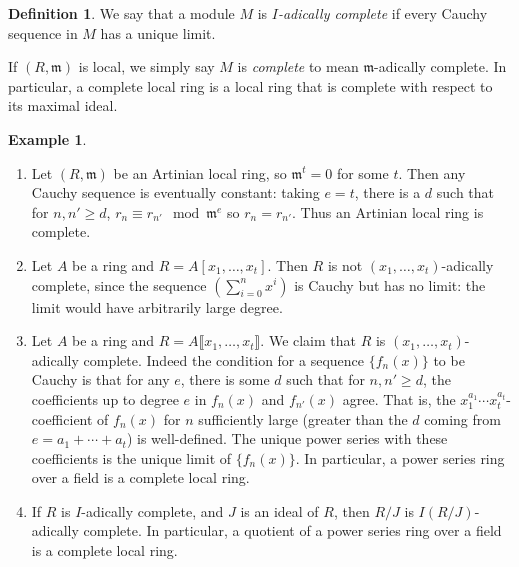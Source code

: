 \documentclass{amsart}[12pt]
\newcommand{\fm}{{\mathfrak m}}
\numberwithin{equation}{section}
\theoremstyle{plain} %
\theoremstyle{definition}
\newtheorem{defn}[equation]{Definition}
\newtheorem{ex}[equation]{Example}
\theoremstyle{remark}
\begin{document}
\begin{defn} We say that a module $M$ is \emph{$I$-adically complete} if every Cauchy sequence in $M$ has a unique limit.

If $(R,\fm)$ is local, we simply say $M$ is \emph{complete} to mean $\fm$-adically complete. In particular, a complete local ring is a local ring that is complete with respect to its maximal ideal.
\end{defn}

\begin{ex}
\begin{enumerate}
\item Let $(R,\fm)$ be an Artinian local ring, so $\fm^t=0$ for some $t$. Then any Cauchy sequence is eventually constant: taking $e=t$, there is a $d$ such that for $n,n'\geq d$, $r_n \equiv r_{n'} \mod \fm^e$ so $r_n = r_{n'}$. Thus an Artinian local ring is complete.
\item Let $A$ be a ring and $R=A[ x_1,\dots,x_t]$. Then $R$ is not $(x_1,\dots,x_t)$-adically complete, since the sequence $(\sum_{i=0}^n x^i)$ is Cauchy but has no limit: the limit would have arbitrarily large degree.
\item Let $A$ be a ring and $R=A\llbracket x_1,\dots,x_t\rrbracket$. We claim that $R$ is $(x_1,\dots,x_t)$-adically complete. Indeed the condition for a sequence $\{f_n(x)\}$ to be Cauchy is that for any $e$, there is some $d$ such that for $n,n'\geq d$, the coefficients up to degree $e$ in $f_n(x)$ and $f_{n'}(x)$ agree. That is, the $x_1^{a_1} \cdots x_t^{a_t}$-coefficient of $f_n(x)$ for $n$ sufficiently large (greater than the $d$ coming from $e=a_1+\cdots+a_t$) is well-defined. The unique power series with these coefficients is the unique limit of $\{f_n(x)\}$.
In particular, a power series ring over a field is a complete local ring.
\item If $R$ is $I$-adically complete, and $J$ is an ideal of $R$, then $R/J$ is $I (R/J)$-adically complete. In particular, a quotient of a power series ring over a field is a complete local ring.
\end{enumerate}
\end{ex}
\end{document}
